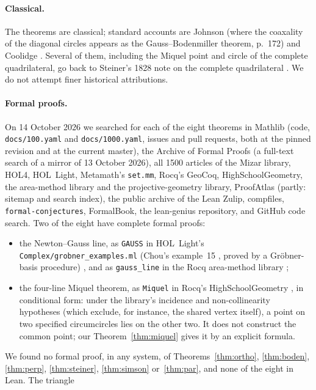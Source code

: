 \documentclass[11pt]{article}
\theoremstyle{definition}
\theoremstyle{remark}
\newcommand{\lean}[1]{\texttt{#1}}
\begin{document}
\paragraph{Classical.} The theorems are classical; standard accounts are Johnson \cite{johnson1929}
(where the coaxality of the diagonal circles appears as the Gauss--Bodenmiller theorem, p.~172) and
Coolidge \cite{coolidge1916}. Several of them, including the Miquel point and circle of the complete
quadrilateral, go back to Steiner's 1828 note on the complete quadrilateral \cite{steiner1828}. We do
not attempt finer historical attributions.

\paragraph{Formal proofs.} On 14 October 2026 we searched for each of the eight theorems in Mathlib
(code, \texttt{docs/100.yaml} and \texttt{docs/1000.yaml}, issues and pull requests, both at the pinned
revision and at the current master), the Archive of Formal Proofs (a full-text search of a mirror of
13 October 2026), all 1500 articles of the Mizar library, HOL4, HOL~Light, Metamath's \texttt{set.mm},
Rocq's GeoCoq, HighSchoolGeometry, the area-method library and the projective-geometry library,
ProofAtlas (partly: sitemap and search index), the public archive of the Lean Zulip, compfiles,
\texttt{formal-conjectures}, FormalBook, the lean-genius repository, and GitHub code search. Two of the
eight have complete formal proofs:
\begin{itemize}
\item the Newton--Gauss line, as \lean{GAUSS} in HOL~Light's \lean{Complex/grobner\_examples.ml}
(Chou's example~15 \cite{chou1988}, proved by a Gr\"obner-basis procedure) \cite{hollight}, and as
\lean{gauss\_line} in the Rocq area-method library \cite{areamethod};
\item the four-line Miquel theorem, as \lean{Miquel} in Rocq's HighSchoolGeometry
\cite{hsgeometry,guilhot2005}, in conditional form: under the library's incidence and
non-collinearity hypotheses (which exclude, for instance, the shared vertex itself), a point on two
specified circumcircles lies on the other two. It does not construct the common point; our
Theorem~\ref{thm:miquel} gives it by an explicit formula.
\end{itemize}
We found no formal proof, in any system, of Theorems~\ref{thm:ortho}, \ref{thm:boden}, \ref{thm:perp},
\ref{thm:steiner}, \ref{thm:simson} or~\ref{thm:par}, and none of the eight in Lean. The triangle
\end{document}
